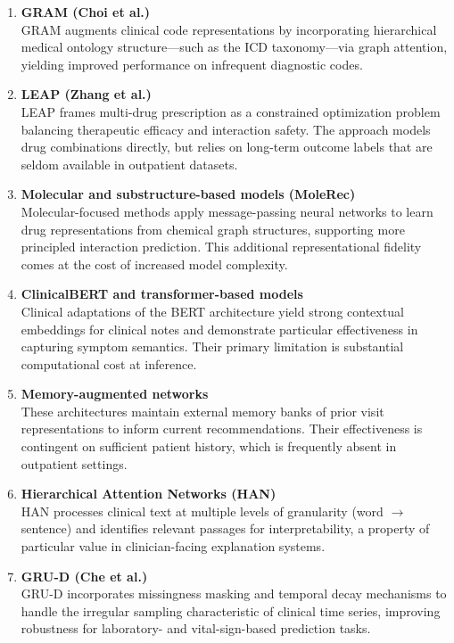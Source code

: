 \begin{enumerate}[label=\textbf{\arabic*.}]
    \item \textbf{GRAM (Choi et al.)} \\
    GRAM augments clinical code representations by incorporating hierarchical medical ontology structure---such as the ICD taxonomy---via graph attention, yielding improved performance on infrequent diagnostic codes.

    \item \textbf{LEAP (Zhang et al.)} \\
    LEAP frames multi-drug prescription as a constrained optimization problem balancing therapeutic efficacy and interaction safety. The approach models drug combinations directly, but relies on long-term outcome labels that are seldom available in outpatient datasets.

    \item \textbf{Molecular and substructure-based models (MoleRec)} \\
    Molecular-focused methods apply message-passing neural networks to learn drug representations from chemical graph structures, supporting more principled interaction prediction. This additional representational fidelity comes at the cost of increased model complexity.

    \item \textbf{ClinicalBERT and transformer-based models} \\
    Clinical adaptations of the BERT architecture yield strong contextual embeddings for clinical notes and demonstrate particular effectiveness in capturing symptom semantics. Their primary limitation is substantial computational cost at inference.

    \item \textbf{Memory-augmented networks} \\
    These architectures maintain external memory banks of prior visit representations to inform current recommendations. Their effectiveness is contingent on sufficient patient history, which is frequently absent in outpatient settings.

    \item \textbf{Hierarchical Attention Networks (HAN)} \\
    HAN processes clinical text at multiple levels of granularity (word $\rightarrow$ sentence) and identifies relevant passages for interpretability, a property of particular value in clinician-facing explanation systems.

    \item \textbf{GRU-D (Che et al.)} \\
    GRU-D incorporates missingness masking and temporal decay mechanisms to handle the irregular sampling characteristic of clinical time series, improving robustness for laboratory- and vital-sign-based prediction tasks.


\end{enumerate}
